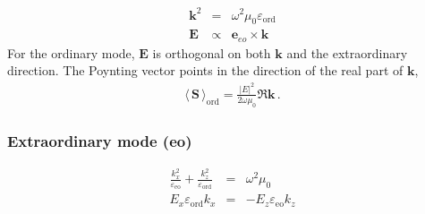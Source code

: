 \documentclass[12pt,a4paper,twoside,openright,BCOR10mm,headsepline,titlepage,abstracton,chapterprefix,final]{scrreprt}
\newcommand\Vector[1]{{\mathbf{#1}}}
\newcommand\vacuum{0}
\newcommand\wavenumber{k}
\newcommand\Wavevector{\Vector{\wavenumber}}
\newcommand\scalarEfield{E}
\newcommand\Efield{\Vector{\scalarEfield}}
\newcommand\vacuumpermeability{\scalarpermeability_{\vacuum}}
\newcommand\scalarpermeability{\mu}
\newcommand\scalarpermittivity{\varepsilon}
\newcommand\ordi{\text{ord}}
\newcommand\eo{\text{eo}}
\newcommand{\timeavg}[1]{{\langle\,#1\,\rangle}}
\begin{document}
\begin{eqnarray}
 \Wavevector^2 &=& \omega^2 \vacuumpermeability \scalarpermittivity_{\ordi} 
 \\
 \Efield &\propto& \Vector{e}_{eo} \times \Wavevector
\end{eqnarray}
For the ordinary mode, $\Efield$ is orthogonal on both $\Wavevector$ and the extraordinary direction.
The Poynting vector points in the direction of the real part of $\Wavevector$,
\begin{eqnarray}
 \timeavg{\Vector{S}}_\ordi = \frac{ |\scalarEfield|^2 }{ 2\omega\vacuumpermeability } \Re \Wavevector\,.\label{eq:Suniaxialordi}
\end{eqnarray}


\subsubsection{Extraordinary mode (eo)}
\begin{eqnarray}
  \frac{\wavenumber_{x}^2 }{\scalarpermittivity_{\eo} } + \frac{\wavenumber_{z}^2 }{\scalarpermittivity_{\ordi} } &=& \omega^2 \vacuumpermeability 
  \label{eq:uniaxialAnisotropicDispersion}
  \\
  \scalarEfield_x \scalarpermittivity_{\ordi} \wavenumber_x &=& -  \scalarEfield_z \scalarpermittivity_{\eo} \wavenumber_z \label{eq:divDuniaxial}
\end{eqnarray}
\end{document}
